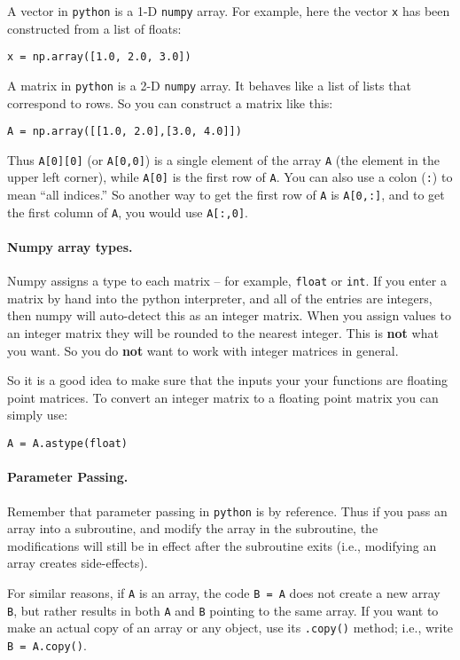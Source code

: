 \documentclass{article}
\begin{document}
A vector in \texttt{python} is a 1-D \texttt{numpy} array.
For example, here the vector \texttt{x} has been constructed from a list of floats:
\begin{verbatim}
x = np.array([1.0, 2.0, 3.0])
\end{verbatim}

A matrix in \texttt{python} is a 2-D \texttt{numpy} array.  It behaves like a list of lists
that correspond to rows.    So you can construct a matrix like this:
\begin{verbatim}
A = np.array([[1.0, 2.0],[3.0, 4.0]])
\end{verbatim}

Thus \texttt{A[0][0]} (or \texttt{A[0,0]}) is
a single element of the array \texttt{A} (the element in the upper left
corner), while \texttt{A[0]} is the first row of \texttt{A}.  You can
also use a colon (\texttt{:}) to mean ``all indices.''  So another way
to get the first row of \texttt{A} is \texttt{A[0,:]}, and to get the
first column of \texttt{A}, you would use \texttt{A[:,0]}.

\paragraph{Numpy array types.} Numpy assigns a type to each matrix --
for example, \texttt{float} or \texttt{int}.  If you enter a matrix by hand into the
python interpreter, and all of the entries are integers, then numpy will
auto-detect this as an integer matrix.  When you assign values to an
integer matrix they will be rounded to the nearest integer.  This is \textbf{not}
what you want.  So you do \textbf{not} want to work with integer matrices in
general.  

So it is a good idea to make sure that the inputs your your functions are floating point matrices.
To convert an integer matrix to a floating point matrix you can simply
use:
\begin{verbatim}
A = A.astype(float)
\end{verbatim}

\paragraph{Parameter Passing.}  Remember that parameter passing in \texttt{python} is by reference.   Thus if you pass an array into a subroutine, and modify the array in the subroutine, the modifications will still be in effect after the subroutine exits (i.e., modifying an array creates side-effects).

For similar reasons, if \texttt{A} is an array, the code \texttt{B = A} does not create a new array \texttt{B}, but rather results in both \texttt{A} and \texttt{B} pointing to the same array.   If you want to make an actual copy of an array or any object, use its \texttt{.copy()} method; i.e., write \texttt{B = A.copy()}. 
\end{document}
